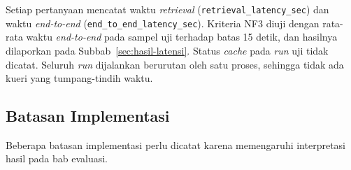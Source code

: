 Setiap pertanyaan mencatat waktu \emph{retrieval} (\texttt{retrieval\_latency\_sec}) dan waktu \emph{end-to-end} (\texttt{end\_to\_end\_latency\_sec}). Kriteria NF3 diuji dengan rata-rata waktu \emph{end-to-end} pada sampel uji terhadap batas 15 detik, dan hasilnya dilaporkan pada Subbab~\ref{sec:hasil-latensi}. Status \emph{cache} pada \emph{run} uji tidak dicatat. Seluruh \emph{run} dijalankan berurutan oleh satu proses, sehingga tidak ada kueri yang tumpang-tindih waktu.

\subsection{Batasan Implementasi}
\label{subsec:batasan-implementasi}

Beberapa batasan implementasi perlu dicatat karena memengaruhi interpretasi hasil pada bab evaluasi.
